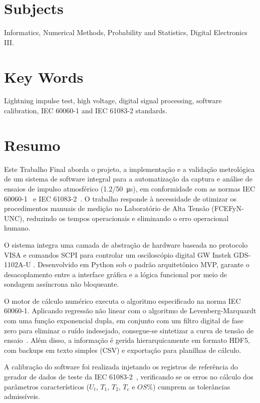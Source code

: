 \section*{Subjects}
Informatics, Numerical Methods, Probability and Statistics, Digital Electronics III.
\vspace{11pt}

\section*{Key Words}
Lightning impulse test, high voltage, digital signal processing, software calibration, IEC 60060-1 and IEC 61083-2 standards.
\vspace{11pt}

\newpage
\section*{Resumo}
Este Trabalho Final aborda o projeto, a implementação e a validação metrológica de um sistema de software integral para a automatização da captura e análise de ensaios de impulso atmosférico (\qty[parse-numbers=false]{1.2/50}{\micro\second}), em conformidade com as normas IEC 60060-1~\cite{iec60060_1} e IEC 61083-2~\cite{iec61083_2}. O trabalho responde à necessidade de otimizar os procedimentos manuais de medição no Laboratório de Alta Tensão (FCEFyN-UNC), reduzindo os tempos operacionais e eliminando o erro operacional humano.

O sistema integra uma camada de abstração de hardware baseada no protocolo VISA e comandos SCPI para controlar um osciloscópio digital GW Instek GDS-1102A-U \cite{gds1000au_ProgrammingManual}. Desenvolvido em Python sob o padrão arquitetônico MVP, garante o desacoplamento entre a interface gráfica e a lógica funcional por meio de sondagem assíncrona não bloqueante.

O motor de cálculo numérico executa o algoritmo especificado na norma IEC 60060-1. Aplicando regressão não linear com o algoritmo de Levenberg-Marquardt com uma função exponencial dupla, em conjunto com um filtro digital de fase zero para eliminar o ruído indesejado, consegue-se sintetizar a curva de tensão de ensaio~\cite{iec60060_1}. Além disso, a informação é gerida hierarquicamente em formato HDF5, com backups em texto simples (CSV) e exportação para planilhas de cálculo.

A calibração do software foi realizada injetando os registros de referência do gerador de dados de teste da IEC 61083-2~\cite{iec61083_2}, verificando se os erros no cálculo dos parâmetros característicos ($U_t$, $T_1$, $T_2$, $T_c$ e $OS\%$) cumprem as tolerâncias admissíveis.
\vspace{11pt}

